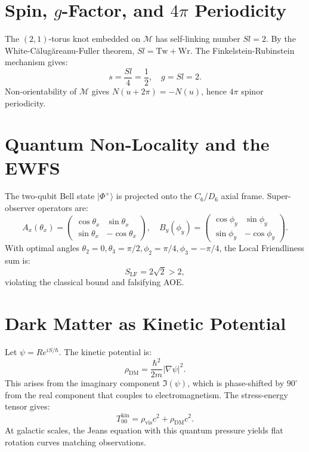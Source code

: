 \documentclass[11pt, a4paper, twocolumn]{article}
\theoremstyle{plain}
\theoremstyle{definition}
\begin{document}
\section{Spin, $g$-Factor, and $4\pi$ Periodicity}
\label{sec:spin}

The $(2,1)$-torus knot embedded on $\mathcal{M}$ has self-linking number $Sl = 2$. By the White-Călugăreanu-Fuller theorem, $Sl = \mathrm{Tw} + \mathrm{Wr}$. The Finkelstein-Rubinstein mechanism gives:
\[
s = \frac{Sl}{4} = \frac{1}{2},\quad g = Sl = 2.
\]
Non-orientability of $\mathcal{M}$ gives $N(u+2\pi) = -N(u)$, hence $4\pi$ spinor periodicity.

\section{Quantum Non-Locality and the EWFS}
\label{sec:ewfs}

The two-qubit Bell state $|\Phi^+\rangle$ is projected onto the $C_6/D_6$ axial frame. Super-observer operators are:
\[
A_x(\theta_x) = \begin{pmatrix} \cos\theta_x & \sin\theta_x \\ \sin\theta_x & -\cos\theta_x \end{pmatrix},\quad
B_y(\phi_y) = \begin{pmatrix} \cos\phi_y & \sin\phi_y \\ \sin\phi_y & -\cos\phi_y \end{pmatrix}.
\]
With optimal angles $\theta_2=0,\theta_3=\pi/2,\phi_2=\pi/4,\phi_3=-\pi/4$, the Local Friendliness sum is:
\[
S_{\mathrm{LF}} = 2\sqrt{2} > 2,
\]
violating the classical bound and falsifying AOE.

\section{Dark Matter as Kinetic Potential}
\label{sec:dm}

Let $\psi = R e^{iS/\hbar}$. The kinetic potential is:
\[
\rho_{\mathrm{DM}} = \frac{\hbar^2}{2m} |\nabla \psi|^2.
\]
This arises from the imaginary component $\Im(\psi)$, which is phase-shifted by $90^\circ$ from the real component that couples to electromagnetism. The stress-energy tensor gives:
\[
T_{00}^{\text{kin}} = \rho_{\text{vis}} c^2 + \rho_{\mathrm{DM}} c^2.
\]
At galactic scales, the Jeans equation with this quantum pressure yields flat rotation curves matching observations.
\end{document}
